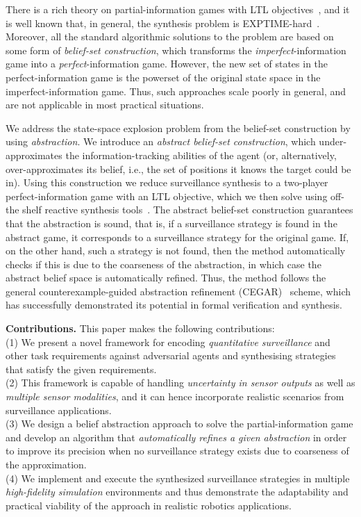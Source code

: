 There is a rich theory on partial-information games with LTL objectives~\cite{DoyenR11,Chatterjee2013}, and it is well known that, in general, the synthesis problem is EXPTIME-hard~\cite{Reif84,BerwangerD08}. Moreover, all the standard algorithmic solutions to the problem are based on some form of \emph{belief-set construction}, which transforms the \emph{imperfect}-information game into a \emph{perfect}-information game. However, the new set of states in the perfect-information game is the powerset of the original state space in the imperfect-information game. Thus, such approaches scale poorly in general, and are not applicable in most practical situations.

We address the state-space explosion problem from the belief-set construction by using \emph{abstraction}. We introduce an \emph{abstract belief-set construction}, which under-approximates the information-tracking abilities of the agent (or, alternatively, over-approximates its belief, i.e., the set of positions it knows the target could be in). Using this construction we reduce surveillance synthesis to a two-player perfect-information game with an LTL objective, which we then solve using off-the shelf reactive synthesis tools~\cite{EhlersR16}. The abstract belief-set construction guarantees that the abstraction is sound, that is, if a surveillance strategy is found in the abstract game, it corresponds to a surveillance strategy for the original game. If, on the other hand, such a strategy is not found, then the method automatically checks if this is due to the coarseness of the abstraction, in which case the abstract belief space is automatically refined. Thus, the method follows the general counterexample-guided abstraction refinement (CEGAR)~\cite{ClarkeGJLV00} scheme, which has successfully demonstrated its potential in formal verification and synthesis.

{\bf Contributions.}  This paper makes the following contributions:\\
(1) We present a novel framework for encoding \emph{quantitative surveillance} and other task requirements against adversarial agents and synthesising strategies that satisfy the given requirements.\\
(2) This framework is capable of handling \emph{uncertainty in sensor outputs} as well as \emph{multiple sensor modalities}, and it can hence incorporate realistic scenarios from surveillance applications.  \\
(3) We design a belief abstraction approach to solve the partial-information game and develop an algorithm that \emph{automatically refines a given abstraction} in order to improve its precision when no surveillance strategy exists due to coarseness of the approximation.\\
(4) We implement and execute the synthesized surveillance strategies in multiple \emph{high-fidelity simulation} environments and thus demonstrate the adaptability and practical viability of the approach in realistic robotics applications.



